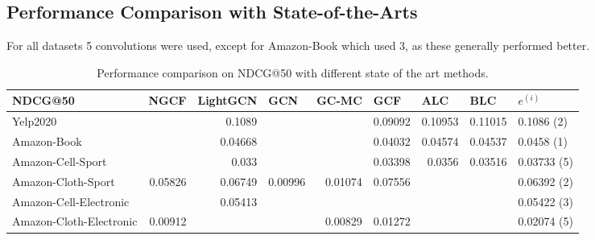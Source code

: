 \subsection{Performance Comparison with State-of-the-Arts}
For all datasets 5 convolutions were used, except for Amazon-Book which used 3, as these generally performed better.


\begin{table*}[] %
    \centering  %
    \begin{tabular}{|l|r|r|r|r|r||r|r|l|}
        \hline
        NDCG@50                 & \multicolumn{1}{l|}{NGCF} & \multicolumn{1}{l|}{LightGCN} & \multicolumn{1}{l|}{GCN} & \multicolumn{1}{l|}{GC-MC} & \multicolumn{1}{l||}{GCF} & \multicolumn{1}{l|}{ALC} & \multicolumn{1}{l|}{BLC} & $e^{(i)}$   \\ \hline
        Yelp2020                &                           & 0.1089                        &                          &                            & 0.09092                   & 0.10953                  & 0.11015                  & 0.1086 (2)  \\ \hline
        Amazon-Book             &                           & 0.04668                       &                          &                            & 0.04032                   & 0.04574                  & 0.04537                  & 0.0458 (1)  \\ \hline
        Amazon-Cell-Sport       &                           & 0.033                         &                          &                            & 0.03398                   & 0.0356                   & 0.03516                  & 0.03733 (5) \\ \hline
        Amazon-Cloth-Sport      & 0.05826                   & 0.06749                       & 0.00996                  & 0.01074                    & 0.07556                   &                          &                          & 0.06392 (2) \\ \hline
        Amazon-Cell-Electronic  &                           & 0.05413                       &                          &                            &                           &                          &                          & 0.05422 (3) \\ \hline
        Amazon-Cloth-Electronic & 0.00912                   &                               &                          & 0.00829                    & 0.01272                   &                          &                          & 0.02074 (5) \\ \hline
    \end{tabular}
    \caption{Performance comparison on NDCG@50 with different state of the art methods.}
    \label{tab:baselines-ndcg}
\end{table*}


